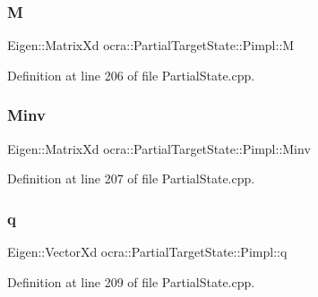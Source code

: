 \subsubsection{\texorpdfstring{M}{M}}
{\footnotesize\ttfamily Eigen\+::\+Matrix\+Xd ocra\+::\+Partial\+Target\+State\+::\+Pimpl\+::M}



Definition at line 206 of file Partial\+State.\+cpp.

\hypertarget{structocra_1_1PartialTargetState_1_1Pimpl_a14905360b00dea81b81fd48960fbe7a5}{}\label{structocra_1_1PartialTargetState_1_1Pimpl_a14905360b00dea81b81fd48960fbe7a5} 
\subsubsection{\texorpdfstring{Minv}{Minv}}
{\footnotesize\ttfamily Eigen\+::\+Matrix\+Xd ocra\+::\+Partial\+Target\+State\+::\+Pimpl\+::\+Minv}



Definition at line 207 of file Partial\+State.\+cpp.

\hypertarget{structocra_1_1PartialTargetState_1_1Pimpl_a0d72ffd9b45ff335dee37874459dfc8d}{}\label{structocra_1_1PartialTargetState_1_1Pimpl_a0d72ffd9b45ff335dee37874459dfc8d} 
\subsubsection{\texorpdfstring{q}{q}}
{\footnotesize\ttfamily Eigen\+::\+Vector\+Xd ocra\+::\+Partial\+Target\+State\+::\+Pimpl\+::q}



Definition at line 209 of file Partial\+State.\+cpp.

\hypertarget{structocra_1_1PartialTargetState_1_1Pimpl_ae9c10dd0f603be49ec43fdf69f8d6556}{}\label{structocra_1_1PartialTargetState_1_1Pimpl_ae9c10dd0f603be49ec43fdf69f8d6556} 
